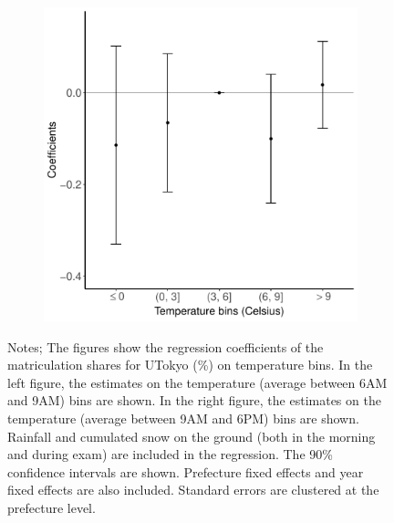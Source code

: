 \documentclass[10pt, pdfmx,hiresbb]{beamer}
\begin{document}
\begin{frame}
\begin{figure}
\begin{minipage}{0.44\textwidth}
\begin{figure}[h]
        \includegraphics[width = \textwidth]{../Output/images/morning_exam_reg_6_exam.pdf}
        \centering
      \end{figure}
    \end{minipage}
    \tiny
    \begin{tablenotes}
    \item Notes;
      The figures show the regression coefficients of the matriculation shares for UTokyo (\%) on temperature bins.
      In the left figure, the estimates on the temperature (average between 6AM and 9AM) bins are shown.
      In the right figure, the estimates on the temperature (average between 9AM and 6PM) bins are shown.
      Rainfall and cumulated snow on the ground (both in the morning and during exam) are included in the regression.
      The 90\% confidence intervals are shown.
      Prefecture fixed effects and year fixed effects are also included.
      Standard errors are clustered at the prefecture level.
    \end{tablenotes}
  \end{figure}
\end{frame}
\end{document}
